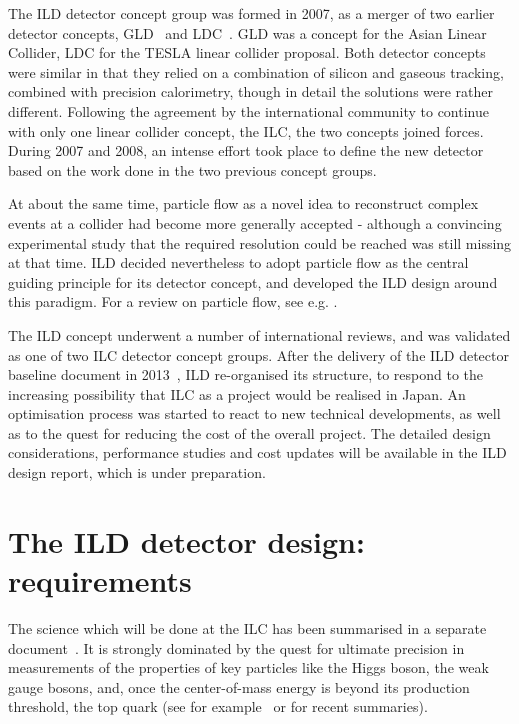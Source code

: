 \documentclass[%
 amsmath,amssymb,
 aps,
 longbibliography,
]{revtex4-1}
\begin{document}
The ILD detector concept group was formed in 2007, as a merger of two earlier detector concepts, GLD~\cite{ild:bib:ref-gld} and LDC~\cite{ild:bib:ref-ldc}. GLD was a concept for the Asian Linear Collider, LDC for the TESLA linear collider proposal. Both detector concepts were similar in that they relied on a combination of silicon and gaseous tracking, combined with precision calorimetry, though in detail the solutions were rather different. Following the agreement by the international community to continue with only one linear collider concept, the ILC, the two concepts joined forces. During 2007 and 2008, an intense effort took place to define the new detector based on the work done in the two previous concept groups. 

At about the same time, particle flow as a novel idea to reconstruct complex events at a collider had become more generally accepted - although a convincing experimental study that the required resolution could be reached was still missing at that time. ILD decided nevertheless to adopt particle flow as the central guiding principle for its detector concept, and developed the ILD design around this paradigm. For a review on particle flow, see e.g. \cite{ild:bib:PandoraPFA}.

The ILD concept underwent a number of international reviews, and was validated as one of two ILC detector concept groups. After the delivery of the ILD detector baseline document in 2013~\cite{Behnke:2013lya}, ILD re-organised its structure, to respond to the increasing possibility that ILC as a project would be realised in Japan. An optimisation process was started to react to new technical developments, as well as to the quest for reducing the cost of the overall project. The detailed design considerations, performance studies and cost updates will be available in the ILD design report, which is under preparation. 

\section{The ILD detector design: requirements}
The science which will be done at the ILC has been summarised in a separate document~\cite{ILCESU1}. It is strongly dominated by the quest for ultimate precision in measurements of the properties of key particles like the Higgs boson, the weak gauge bosons, and, once the center-of-mass energy is beyond its production threshold, the top quark (see for example~\cite{Fujii:2017vwa} or \cite{ILCESU1} for recent summaries). 
\end{document}
